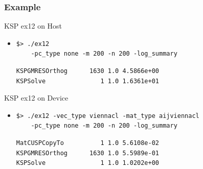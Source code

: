 \begin{frame}[fragile]
\frametitle{Example}
  \begin{block}{KSP ex12 on Host}
  \begin{itemize}
   \item
    \begin{lstlisting}
$> ./ex12 
    -pc_type none -m 200 -n 200 -log_summary
    \end{lstlisting}
    \begin{lstlisting}
KSPGMRESOrthog      1630 1.0 4.5866e+00
KSPSolve               1 1.0 1.6361e+01
    \end{lstlisting}

  \end{itemize}
  \end{block}

  
  \begin{block}{KSP ex12 on Device}
  \begin{itemize}
   \item
    \begin{lstlisting}
$> ./ex12 -vec_type viennacl -mat_type aijviennacl
    -pc_type none -m 200 -n 200 -log_summary
    \end{lstlisting}
    \begin{lstlisting}
MatCUSPCopyTo          1 1.0 5.6108e-02
KSPGMRESOrthog      1630 1.0 5.5989e-01
KSPSolve               1 1.0 1.0202e+00
    \end{lstlisting}

  \end{itemize}
  \end{block}

\end{frame}


